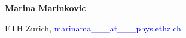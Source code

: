 \documentclass[a4paper,10pt]{article}
\begin{document}
% 
% 
%  

\begin{minipage}[t]{0.25\textwidth}
\textbf{Marina Marinkovic}
\end{minipage} \begin{minipage}[t]{0.75\textwidth} 
ETH Zurich, \textcolor{blue}{marinama\_\_\_at\_\_\_phys.ethz.ch}
\end{minipage} \\
\end{document}
